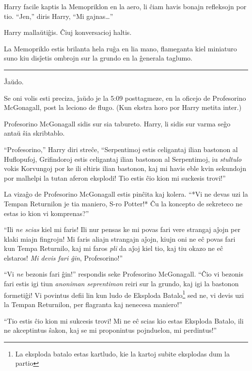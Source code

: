 Harry facile kaptis la Memopriklon en la aero, li ĉiam havis bonajn
refleksojn por tio. ``Jen,'' diris Harry, ``Mi gajnas\ldots''

Harry mallaŭtiĝis. Ĉiuj konversacioj haltis.

La Memopriklo estis brilanta hela ruĝa en lia mano, flameganta kiel
miniaturo suno kiu disĵetis ombrojn sur la grundo en la ĝenerala
taglumo.

\begin{center}\rule{3in}{0.4pt}\end{center}

Ĵaŭdo.

Se oni volis esti preciza, ĵaŭdo je la 5:09 posttagmeze, en la oficejo
de Profesorino McGonagall, post la leciono de flugo. (Kun ekstra horo
por Harry metita inter.)

Profesorino McGonagall sidis sur sia tabureto. Harry, li sidis sur varma seĝo antaŭ ŝia skribtablo.

``Profesorino,'' Harry diri streĉe, ``Serpentimoj estis celigantaj
ilian bastonon al Huflopufoj, Grifindoroj estis celigantaj ilian
bastonon al Serpentimoj, iu \emph{stultulo} vokis Korvungoj por ke ili
eltiris ilian bastonon, kaj mi havis eble kvin sekundojn por malhelpi la
tutan aferon eksplodi! Tio estis ĉio kion mi suckesis trovi!''

La vizaĝo de Profesorino McGonagall estis pinĉita kaj kolera. ``*Vi ne
devas uzi la Tempan Returnilon je tia maniero, S-ro Potter!* Ĉu la
koncepto de sekreteco ne estas io kion vi komprenas?''

``Ili \emph{ne scias} kiel mi faris! Ili nur pensas ke mi povas fari
vere strangaj aĵojn per klaki miajn fingrojn! Mi faris aliajn
strangajn aĵojn, kiujn oni ne eĉ povas fari kun Tempa Returnilo, kaj
mi faros \emph{pli} da aĵoj kiel tio, kaj tiu okazo ne eĉ elstaros!
\emph{Mi devis fari ĝin}, Profesorino!''

``Vi \emph{ne} bezonis fari ĝin!'' respondis seke Profesorino
McGonagall. ``Ĉio vi bezonis fari estis igi tiun \emph{anoniman
seprentimon} reiri sur la grundo, kaj igi la bastonon formetiĝi! Vi
povintus defii lin kun ludo de Eksploda Batalo\footnote{La eksploda
batalo estas kartludo, kie la kartoj subite eksplodas dum la partio}
sed ne, vi devis uzi la Tempan Returnilon, per flagranta kaj nenecesa
maniero!''

``Tio estis ĉio kion mi sukcesis trovi! Mi ne eĉ scias kio estas
Eksploda Batalo, ili ne akceptintus ŝakon, kaj se mi proponintus
pojnduelon, mi perdintus!''

